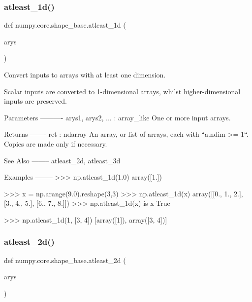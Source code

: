 \subsubsection{\texorpdfstring{atleast\+\_\+1d()}{atleast\_1d()}}
{\footnotesize\ttfamily def numpy.\+core.\+shape\+\_\+base.\+atleast\+\_\+1d (\begin{DoxyParamCaption}\item[{}]{arys }\end{DoxyParamCaption})}

\begin{DoxyVerb}Convert inputs to arrays with at least one dimension.

Scalar inputs are converted to 1-dimensional arrays, whilst
higher-dimensional inputs are preserved.

Parameters
----------
arys1, arys2, ... : array_like
    One or more input arrays.

Returns
-------
ret : ndarray
    An array, or list of arrays, each with ``a.ndim >= 1``.
    Copies are made only if necessary.

See Also
--------
atleast_2d, atleast_3d

Examples
--------
>>> np.atleast_1d(1.0)
array([1.])

>>> x = np.arange(9.0).reshape(3,3)
>>> np.atleast_1d(x)
array([[0., 1., 2.],
       [3., 4., 5.],
       [6., 7., 8.]])
>>> np.atleast_1d(x) is x
True

>>> np.atleast_1d(1, [3, 4])
[array([1]), array([3, 4])]\end{DoxyVerb}
 \mbox{\label{namespacenumpy_1_1core_1_1shape__base_a2dac0cd8ee016e5da4303c8f513baf7c}} 
\subsubsection{\texorpdfstring{atleast\+\_\+2d()}{atleast\_2d()}}
{\footnotesize\ttfamily def numpy.\+core.\+shape\+\_\+base.\+atleast\+\_\+2d (\begin{DoxyParamCaption}\item[{}]{arys }\end{DoxyParamCaption})}

